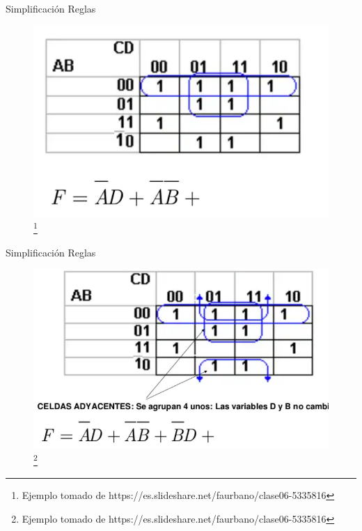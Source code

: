 \documentclass[aspectratio=169]{beamer}
\begin{document}
\begin{frame}{Simplificación Reglas}
    \begin{figure}
        \includegraphics[scale=.4]{ejem/kar/ej_3.png}\footnote{Ejemplo tomado de https://es.slideshare.net/faurbano/clase06-5335816}
    \end{figure}
\end{frame}

\begin{frame}{Simplificación Reglas}
    \begin{figure}
        \includegraphics[scale=.4]{ejem/kar/ej_4.png}\footnote{Ejemplo tomado de https://es.slideshare.net/faurbano/clase06-5335816}
    \end{figure}
\end{frame}
\end{document}

